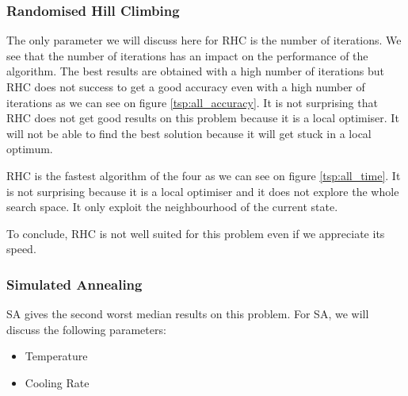 \documentclass[10pt]{article}
\begin{document}
			\subsubsection*{Randomised Hill Climbing}
				The only parameter we will discuss here for RHC is the number of iterations. We see that the number of iterations has an impact on the performance of the algorithm. The best results are obtained with a high number of iterations but RHC does not success to get a good accuracy even with a high number of iterations as we can see on figure \ref{tsp:all_accuracy}. It is not surprising that RHC does not get good results on this problem because it is a local optimiser. It will not be able to find the best solution because it will get stuck in a local optimum.

				RHC is the fastest algorithm of the four as we can see on figure \ref{tsp:all_time}. It is not surprising because it is a local optimiser and it does not explore the whole search space. It only exploit the neighbourhood of the current state.

				To conclude, RHC is not well suited for this problem even if we appreciate its speed.
			\subsubsection*{Simulated Annealing}
				SA gives the second worst median results on this problem. For SA, we will discuss the following parameters:
				\begin{itemize}
					\item Temperature
					\item Cooling Rate
				\end{itemize}
\end{document}
